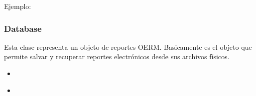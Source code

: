 \documentclass[a4paper,12pt,spanish]{sphinxmanual}
\begin{document}
\begin{fulllineitems}
\begin{fulllineitems}
\begin{quote}
\begin{description}
\end{description}\end{quote}
\begin{description}
\item[{Ejemplo:}] \leavevmode
\begin{sphinxVerbatim}[commandchars=\\\{\}]
   
  
\end{sphinxVerbatim}

\end{description}

\end{fulllineitems}


\end{fulllineitems}

\label{\detokenize{openerm.Database:database}}\label{\detokenize{openerm.Database:module-openerm.Database}}\label{\detokenize{openerm.Database:database}}

\subsubsection{Database}
\label{\detokenize{openerm.Database:id1}}\label{\detokenize{openerm.Database::doc}}
Esta clase representa un objeto  de reportes OERM. Basicamente es
el objeto que permite salvar y recuperar reportes electrónicos desde sus
archivos físicos.



\begin{itemize}
\item {} 
{\hyperref[\detokenize{openerm.MetadataContainer:module-openerm.MetadataContainer}]{}}

\item {} 
{\hyperref[\detokenize{openerm.PageContainer:module-openerm.PageContainer}]{}}

\end{itemize}
\end{document}
